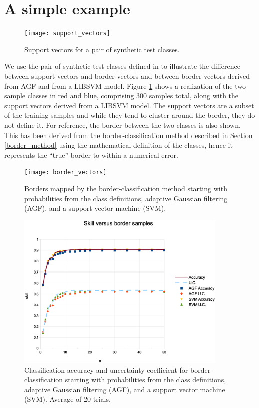 \documentclass[11pt]{article}
\begin{document}
\section{A simple example}

\begin{figure}
\texttt{[image: support\_vectors]}
\caption{Support vectors for a pair of synthetic test classes.}\label{sample_sv}
\end{figure}

We use the pair of synthetic test classes defined in \citet{Mills2011} to 
illustrate the difference between support vectors and border vectors and 
between border vectors derived from AGF and from a LIBSVM model.
Figure \ref{sample_sv} shows a realization of the two sample classes 
in red and blue, comprising 300 samples total, along
with the support vectors derived from a LIBSVM model.
The support vectors are a subset of the training samples and while they
tend to cluster around the border, they do not define it.
For reference, the border between the two classes is also shown.
This has been derived from the border-classification method described in 
Section \ref{border_method} using the mathematical definition of the classes,
hence it represents the ``true'' border to within a numerical error.

\begin{figure}
\texttt{[image: border\_vectors]}
\caption{Borders mapped by the border-classification method starting with probabilities from the class definitions, adaptive Gaussian filtering (AGF), and a support vector machine (SVM).}
\label{border_vectors}
\end{figure}

\begin{figure}
\includegraphics[width=0.9\textwidth]{skill_v_nb}
\caption{Classification accuracy and uncertainty coefficient for border-classification starting with probabilities from the class definitions, adaptive Gaussian filtering (AGF), and a support vector machine (SVM). Average of 20 trials.}
\label{skill_v_nb}
\end{figure}
\end{document}
